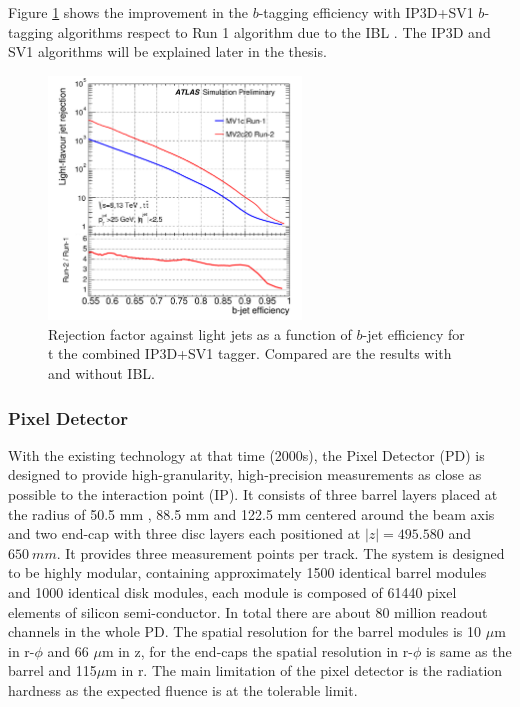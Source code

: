 Figure \ref{fig:chap2:ATLAS:ITK:IBL:Btag} shows the improvement in the $b$-tagging efficiency with IP3D+SV1 $b$-tagging algorithms respect to Run 1 algorithm due to the IBL \cite{IBL_Btag, IBL_Btag2}. The IP3D and SV1 algorithms will be explained later in the thesis.
\begin{figure}[ht]
    \centering
    \includegraphics[width=0.6\textwidth]{Ch2/Img/IBL_btag2.png}
    \caption{Rejection factor against light jets as a function of $b$-jet efficiency for t the combined IP3D+SV1 tagger. Compared are the results with and without IBL.}
    \label{fig:chap2:ATLAS:ITK:IBL:Btag}
\end{figure}
\subsubsection{Pixel Detector}
\label{chap2:ATLAS:ITK:PD}
With the existing technology at that time (2000s), the Pixel Detector (PD) is designed to provide high-granularity, high-precision measurements as close as possible to the interaction point (IP). It consists of three barrel layers placed at the radius of 50.5 mm , 88.5 mm and 122.5 mm centered around the beam axis and two end-cap with three disc layers each positioned at $|z|= 495.580$ and $650 \ mm$. It provides three measurement points per track. The system is designed to be highly modular, containing approximately 1500 identical barrel modules and 1000 identical disk modules, each module is composed of 61440 pixel elements of silicon semi-conductor. In total there are about 80 million readout channels in the whole PD. The spatial resolution for the barrel modules is 10 $\mu$m in r-$\phi$ and 66 $\mu$m in z, for the end-caps the spatial resolution in r-$\phi$ is same as the barrel and 115$\mu$m in r. The main limitation of the pixel detector is the radiation hardness as the expected fluence is at the tolerable limit. 
